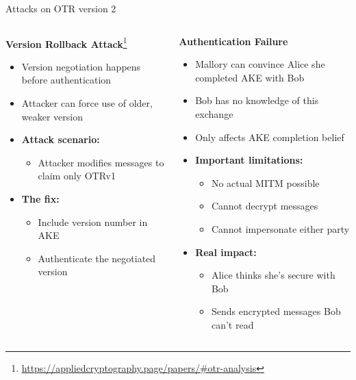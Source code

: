 \documentclass[aspectratio=169, lualatex, handout]{beamer}
\begin{document}
\begin{frame}{Attacks on OTR version 2}
	\begin{columns}
		\begin{column}{0.5\textwidth}
			\textbf{Version Rollback Attack}\footnote{\url{https://appliedcryptography.page/papers/\#otr-analysis}}
			\begin{itemize}
				\item Version negotiation happens before authentication
				\item Attacker can force use of older, weaker version
				\item \textbf{Attack scenario:}
				      \begin{itemize}
					      \item Attacker modifies messages to claim only OTRv1
				      \end{itemize}
				\item \textbf{The fix:}
				      \begin{itemize}
					      \item Include version number in AKE
					      \item Authenticate the negotiated version
				      \end{itemize}
			\end{itemize}
		\end{column}
		\begin{column}{0.5\textwidth}
			\textbf{Authentication Failure}
			\begin{itemize}
				\item Mallory can convince Alice she completed AKE with Bob
				\item Bob has no knowledge of this exchange
				\item Only affects AKE completion belief
				\item \textbf{Important limitations:}
				      \begin{itemize}
					      \item No actual MITM possible
					      \item Cannot decrypt messages
					      \item Cannot impersonate either party
				      \end{itemize}
				\item \textbf{Real impact:}
				      \begin{itemize}
					      \item Alice thinks she's secure with Bob
					      \item Sends encrypted messages Bob can't read
				      \end{itemize}
			\end{itemize}
		\end{column}
	\end{columns}
\end{frame}
\end{document}
